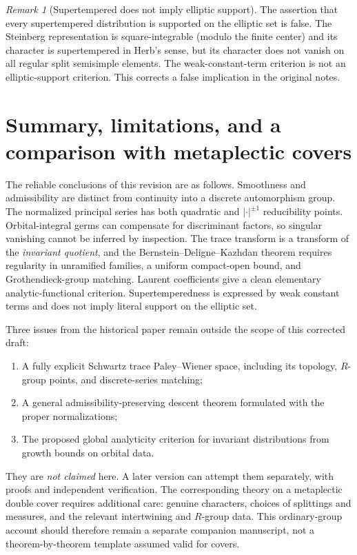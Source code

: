 \documentclass[12pt,letterpaper]{amsart}
\numberwithin{equation}{section}
\theoremstyle{definition}
\theoremstyle{remark}
\newtheorem{remark}[theorem]{Remark}
\begin{document}
\begin{remark}[Supertempered does not imply elliptic support]\label{rem:support}
The assertion that every supertempered distribution is supported on the elliptic set is false. The Steinberg representation is square-integrable (modulo the finite center) and its character is supertempered in Herb's sense, but its character does not vanish on all regular split semisimple elements. The weak-constant-term criterion is not an elliptic-support criterion. This corrects a false implication in the original notes.
\end{remark}

\section{Summary, limitations, and a comparison with metaplectic covers}\label{sec:summary}
The reliable conclusions of this revision are as follows.  Smoothness and admissibility are distinct from continuity into a discrete automorphism group.  The normalized principal series has both quadratic and $|\cdot|^{\pm1}$ reducibility points.  Orbital-integral germs can compensate for discriminant factors, so singular vanishing cannot be inferred by inspection.  The trace transform is a transform of the \emph{invariant quotient}, and the Bernstein--Deligne--Kazhdan theorem requires regularity in unramified families, a uniform compact-open bound, and Grothendieck-group matching.  Laurent coefficients give a clean elementary analytic-functional criterion.  Supertemperedness is expressed by weak constant terms and does not imply literal support on the elliptic set.

Three issues from the historical paper remain outside the scope of this corrected draft:
\begin{enumerate}[label=\arabic*.,leftmargin=*]
\item A fully explicit Schwartz trace Paley--Wiener space, including its topology, $R$-group points, and discrete-series matching;
\item A general admissibility-preserving descent theorem formulated with the proper normalizations;
\item The proposed global analyticity criterion for invariant distributions from growth bounds on orbital data.
\end{enumerate}
They are \emph{not claimed} here. A later version can attempt them separately, with proofs and independent verification. The corresponding theory on a metaplectic double cover requires additional care: genuine characters, choices of splittings and measures, and the relevant intertwining and $R$-group data. This ordinary-group account should therefore remain a separate companion manuscript, not a theorem-by-theorem template assumed valid for covers.
\end{document}
